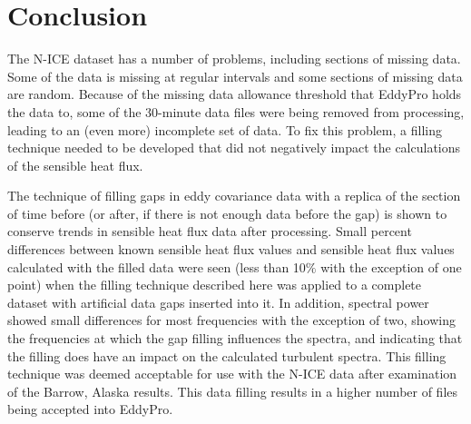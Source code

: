  \section{Conclusion}
The N-ICE dataset has a number of problems, including sections of missing data. Some of the data is missing at regular intervals and some sections of missing data are random. Because of the missing data allowance threshold that EddyPro holds the data to, some of the 30-minute data files were being removed from processing, leading to an (even more) incomplete set of data. To fix this problem, a filling technique needed to be developed that did not negatively impact the calculations of the sensible heat flux.

The technique of filling gaps in eddy covariance data with a replica of the section of time before (or after, if there is not enough data before the gap) is shown to conserve trends in sensible heat flux data after processing. Small percent differences between known sensible heat flux values and sensible heat flux values calculated with the filled data were seen (less than 10$\%$ with the exception of one point) when the filling technique described here was applied to a complete dataset with artificial data gaps inserted into it. In addition, spectral power showed small differences for most frequencies with the exception of two, showing the frequencies at which the gap filling influences the spectra, and indicating that the filling does have an impact on the calculated turbulent spectra. This filling technique was deemed acceptable for use with the N-ICE data after examination of the Barrow, Alaska results. This data filling results in a higher number of files being accepted into EddyPro.

